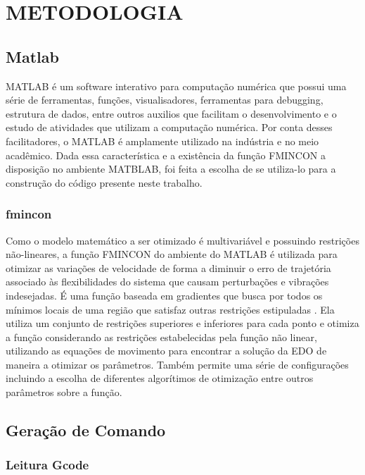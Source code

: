 \chapter{METODOLOGIA}

\section{Matlab}

MATLAB é um software interativo para computação numérica que possui uma série
de ferramentas, funções, visualisadores, ferramentas para debugging, estrutura de dados, 
entre outros auxilios que facilitam o desenvolvimento e o estudo de atividades
que utilizam a computação numérica. Por conta desses facilitadores, o MATLAB é
amplamente utilizado na indústria e no meio acadêmico.\cite{higham16}
Dada essa característica e a existência da função FMINCON a disposição
no ambiente MATBLAB, foi feita a escolha de se utiliza-lo para
a construção do código presente neste trabalho.

\subsection{fmincon}
Como o modelo matemático a ser otimizado é multivariável e 
possuindo restrições não-lineares, a função FMINCON do ambiente 
do MATLAB é utilizada para otimizar as variações de velocidade 
de forma a diminuir o erro de trajetória associado às 
flexibilidades do sistema que causam perturbações e vibrações 
indesejadas.
É uma função baseada em gradientes que busca por todos os 
mínimos locais de uma região que satisfaz outras restrições 
estipuladas \cite{albaghdadi21}.
Ela utiliza um conjunto de restrições superiores e inferiores 
para cada ponto e otimiza a função considerando as restrições 
estabelecidas pela função não linear, utilizando as equações de 
movimento para encontrar a solução da EDO de maneira a 
otimizar os parâmetros. Também permite uma série de configurações
incluindo a escolha de diferentes algorítimos de otimização entre
outros parâmetros sobre a função.

\section{Geração de Comando}

\subsection{Leitura Gcode}

